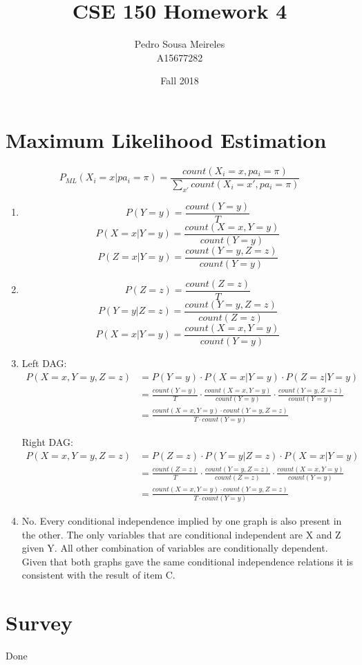 \documentclass[11]{article}
\title{CSE 150 Homework 4}
\date{Fall 2018}
\author{Pedro Sousa Meireles\\ A15677282}
\begin{document}
\maketitle
\section{Maximum Likelihood Estimation}
$$P_{ML}(X_i=x|pa_i=\pi)=\frac{count(X_i=x,pa_i=\pi)}{\sum_{x'}count(X_i=x',pa_i=\pi)}$$
\begin{enumerate}[label=(\alph*)]
\item
$$P(Y=y)=\frac{count(Y=y)}{T}$$
$$P(X=x|Y=y)=\frac{count(X=x,Y=y)}{count(Y=y)}$$
$$P(Z=x|Y=y)=\frac{count(Y=y,Z=z)}{count(Y=y)}$$
\item
$$P(Z=z)=\frac{count(Z=z)}{T}$$
$$P(Y=y|Z=z)=\frac{count(Y=y,Z=z)}{count(Z=z)}$$
$$P(X=x|Y=y)=\frac{count(X=x,Y=y)}{count(Y=y)}$$
\item
Left DAG:
\begin{align*}
P(X=x, Y=y, Z=z)&=P(Y=y) \cdot P(X=x|Y=y) \cdot P(Z=z|Y=y)\\
&=\frac{count(Y=y)}{T} \cdot \frac{count(X=x,Y=y)}{count(Y=y)} \cdot \frac{count(Y=y,Z=z)}{count(Y=y)}\\
&=\frac{count(X=x,Y=y) \cdot count(Y=y,Z=z)}{T \cdot count(Y=y)}
\end{align*}

Right DAG:
\begin{align*}
P(X=x, Y=y, Z=z)&=P(Z=z) \cdot P(Y=y|Z=z) \cdot P(X=x|Y=y)\\
&=\frac{count(Z=z)}{T} \cdot \frac{count(Y=y,Z=z)}{count(Z=z)} \cdot \frac{count(X=x,Y=y)}{count(Y=y)}\\
&=\frac{count(X=x,Y=y) \cdot count(Y=y,Z=z)}{T \cdot count(Y=y)}
\end{align*}

\item
No. Every conditional independence implied by one graph is also present in the other. The only variables that are conditional independent are X and Z given Y. All other combination of variables are conditionally dependent. Given that both graphs gave the same conditional independence relations it is consistent with the result of item C.
\end{enumerate}
\pagebreak

\section{Survey}
Done
\end{document}
